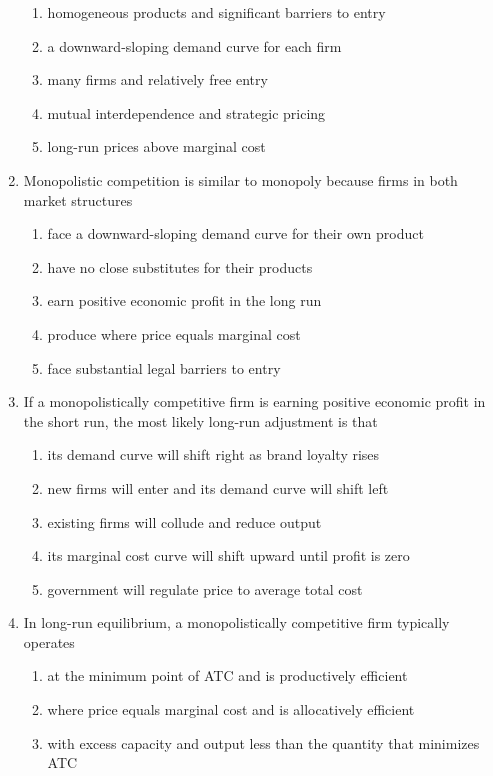 \documentclass[10pt]{article}
\newenvironment{choiceslist}
  {\begin{enumerate}[label=(\Alph*), leftmargin=1.6em, itemsep=0.12em, topsep=0.18em, parsep=0pt]}
  {\end{enumerate}}
\begin{document}
\begin{multicols*}{2}
\begin{enumerate}[resume*=apq, leftmargin=*, itemsep=0.85em, topsep=0.2em, parsep=0pt]
\begin{choiceslist}
\item homogeneous products and significant barriers to entry
\item a downward-sloping demand curve for each firm
\item many firms and relatively free entry
\item mutual interdependence and strategic pricing
\item long-run prices above marginal cost
\end{choiceslist}
\item Monopolistic competition is similar to monopoly because firms in both market structures
\begin{choiceslist}
\item face a downward-sloping demand curve for their own product
\item have no close substitutes for their products
\item earn positive economic profit in the long run
\item produce where price equals marginal cost
\item face substantial legal barriers to entry
\end{choiceslist}
\item If a monopolistically competitive firm is earning positive economic profit in the short run, the most likely long-run adjustment is that
\begin{choiceslist}
\item its demand curve will shift right as brand loyalty rises
\item new firms will enter and its demand curve will shift left
\item existing firms will collude and reduce output
\item its marginal cost curve will shift upward until profit is zero
\item government will regulate price to average total cost
\end{choiceslist}
\item In long-run equilibrium, a monopolistically competitive firm typically operates
\begin{choiceslist}
\item at the minimum point of ATC and is productively efficient
\item where price equals marginal cost and is allocatively efficient
\item with excess capacity and output less than the quantity that minimizes ATC

\end{choiceslist}
\end{enumerate}
\end{multicols*}
\end{document}
